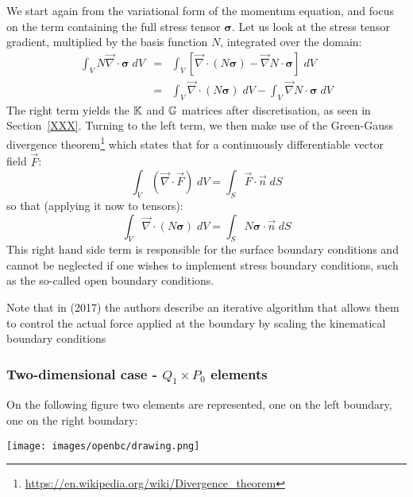 We start again from the variational form of the momentum equation, and focus on the term containing 
the full stress tensor ${\bm \sigma}$. 
Let us look at the stress tensor gradient, multiplied by the basis function $N$, integrated over the domain:
\begin{eqnarray}
\int_V N {\vec \nabla}\cdot {\bm \sigma} \; dV 
&=&\int_V \left[ {\vec \nabla}\cdot(N {\bm \sigma}) -{\vec \nabla}N \cdot {\bm \sigma}\right] \; dV \nonumber\\
&=& \int_V  {\vec \nabla}\cdot(N {\bm \sigma})\;  dV -\int_V  {\vec \nabla}N \cdot {\bm \sigma} \; dV
\end{eqnarray}
The right term yields the ${\mathbb{K}}$ and ${\mathbb{G}}$ matrices after discretisation, as seen in Section~\ref{XXX}.
Turning to the left term, we then make use of the Green-Gauss divergence 
theorem\footnote{\url{https://en.wikipedia.org/wiki/Divergence_theorem}} which states that for 
a continuously differentiable vector field $\vec{F}$:
\[
\int_V ({\vec \nabla} \cdot {\vec F})\; dV = \int _S {\vec F}\cdot {\vec n} \; dS
\]
so that (applying it now to tensors):
\[
\int_V  {\vec \nabla}\cdot(N {\bm \sigma})\;  dV =\int_S  N {\bm \sigma} \cdot {\vec n} \;  dS
\]
This right hand side term is responsible for the surface 
boundary conditions and cannot be neglected if one 
wishes to implement stress boundary conditions, 
such as the so-called open boundary conditions. 

Note that in \textcite{lige17} (2017) the authors describe an iterative algorithm that 
allows them to control the actual force applied at the boundary by 
scaling the kinematical boundary conditions

\subsubsection{Two-dimensional case - $Q_1 \times P_0$ elements}

On the following figure two elements are represented, one on the 
left boundary, one on the right boundary:
\begin{center}
\texttt{[image: images/openbc/drawing.png]}
\end{center}

